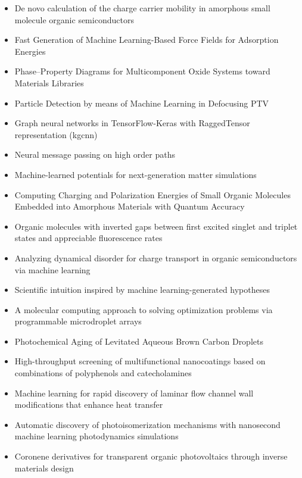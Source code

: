 \documentclass{article}%
\begin{document}
\begin{itemize}
\item%
De novo calculation of the charge carrier mobility in amorphous small molecule organic semiconductors%
\item%
Fast Generation of Machine Learning{-}Based Force Fields for Adsorption Energies%
\item%
Phase–Property Diagrams for Multicomponent Oxide Systems toward Materials Libraries%
\item%
Particle Detection by means of Machine Learning in Defocusing PTV%
\item%
Graph neural networks in TensorFlow{-}Keras with RaggedTensor representation (kgcnn)%
\item%
Neural message passing on high order paths%
\item%
Machine{-}learned potentials for next{-}generation matter simulations%
\item%
Computing Charging and Polarization Energies of Small Organic Molecules Embedded into Amorphous Materials with Quantum Accuracy%
\item%
Organic molecules with inverted gaps between first excited singlet and triplet states and appreciable fluorescence rates%
\item%
Analyzing dynamical disorder for charge transport in organic semiconductors via machine learning%
\item%
Scientific intuition inspired by machine learning{-}generated hypotheses%
\item%
A molecular computing approach to solving optimization problems via programmable microdroplet arrays%
\item%
Photochemical Aging of Levitated Aqueous Brown Carbon Droplets%
\item%
High{-}throughput screening of multifunctional nanocoatings based on combinations of polyphenols and catecholamines%
\item%
Machine learning for rapid discovery of laminar flow channel wall modifications that enhance heat transfer%
\item%
Automatic discovery of photoisomerization mechanisms with nanosecond machine learning photodynamics simulations%
\item%
Coronene derivatives for transparent organic photovoltaics through inverse materials design%
\end{itemize}

%
\end{document}

